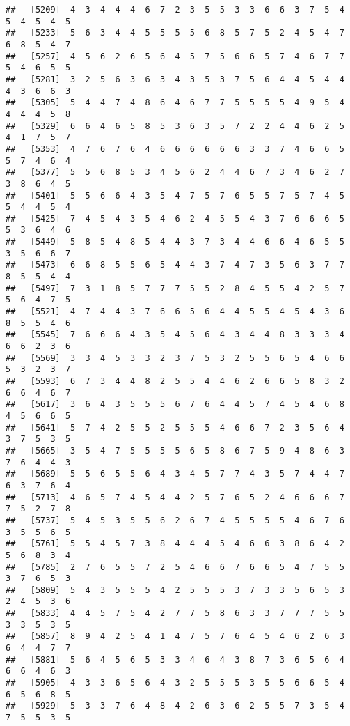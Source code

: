 \documentclass[
]{book}
\begin{document}
\begin{verbatim}
##   [5209]  4  3  4  4  4  6  7  2  3  5  5  3  3  6  6  3  7  5  4  5  4  5  4  5
##   [5233]  5  6  3  4  4  5  5  5  5  6  8  5  7  5  2  4  5  4  7  6  8  5  4  7
##   [5257]  4  5  6  2  6  5  6  4  5  7  5  6  6  5  7  4  6  7  7  5  4  6  5  5
##   [5281]  3  2  5  6  3  6  3  4  3  5  3  7  5  6  4  4  5  4  4  4  3  6  6  3
##   [5305]  5  4  4  7  4  8  6  4  6  7  7  5  5  5  5  4  9  5  4  4  4  4  5  8
##   [5329]  6  6  4  6  5  8  5  3  6  3  5  7  2  2  4  4  6  2  5  4  1  7  5  7
##   [5353]  4  7  6  7  6  4  6  6  6  6  6  6  3  3  7  4  6  6  5  5  7  4  6  4
##   [5377]  5  5  6  8  5  3  4  5  6  2  4  4  6  7  3  4  6  2  7  3  8  6  4  5
##   [5401]  5  5  6  6  4  3  5  4  7  5  7  6  5  5  7  5  7  4  5  5  4  4  5  4
##   [5425]  7  4  5  4  3  5  4  6  2  4  5  5  4  3  7  6  6  6  5  5  3  6  4  6
##   [5449]  5  8  5  4  8  5  4  4  3  7  3  4  4  6  6  4  6  5  5  3  5  6  6  7
##   [5473]  6  6  8  5  5  6  5  4  4  3  7  4  7  3  5  6  3  7  7  8  5  5  4  4
##   [5497]  7  3  1  8  5  7  7  7  5  5  2  8  4  5  5  4  2  5  7  5  6  4  7  5
##   [5521]  4  7  4  4  3  7  6  6  5  6  4  4  5  5  4  5  4  3  6  8  5  5  4  6
##   [5545]  7  6  6  6  4  3  5  4  5  6  4  3  4  4  8  3  3  3  4  6  6  2  3  6
##   [5569]  3  3  4  5  3  3  2  3  7  5  3  2  5  5  6  5  4  6  6  5  3  2  3  7
##   [5593]  6  7  3  4  4  8  2  5  5  4  4  6  2  6  6  5  8  3  2  6  6  4  6  7
##   [5617]  3  6  4  3  5  5  5  6  7  6  4  4  5  7  4  5  4  6  8  4  5  6  6  5
##   [5641]  5  7  4  2  5  5  2  5  5  5  4  6  6  7  2  3  5  6  4  3  7  5  3  5
##   [5665]  3  5  4  7  5  5  5  5  6  5  8  6  7  5  9  4  8  6  3  7  6  4  4  3
##   [5689]  5  5  6  5  5  6  4  3  4  5  7  7  4  3  5  7  4  4  7  6  3  7  6  4
##   [5713]  4  6  5  7  4  5  4  4  2  5  7  6  5  2  4  6  6  6  7  7  5  2  7  8
##   [5737]  5  4  5  3  5  5  6  2  6  7  4  5  5  5  5  4  6  7  6  3  5  5  6  5
##   [5761]  5  5  4  5  7  3  8  4  4  4  5  4  6  6  3  8  6  4  2  5  6  8  3  4
##   [5785]  2  7  6  5  5  7  2  5  4  6  6  7  6  6  5  4  7  5  5  3  7  6  5  3
##   [5809]  5  4  3  5  5  5  4  2  5  5  5  3  7  3  3  5  6  5  3  2  4  5  3  6
##   [5833]  4  4  5  7  5  4  2  7  7  5  8  6  3  3  7  7  7  5  5  3  3  5  3  5
##   [5857]  8  9  4  2  5  4  1  4  7  5  7  6  4  5  4  6  2  6  3  6  4  4  7  7
##   [5881]  5  6  4  5  6  5  3  3  4  6  4  3  8  7  3  6  5  6  4  6  6  4  6  3
##   [5905]  4  3  3  6  5  6  4  3  2  5  5  5  3  5  5  6  6  5  4  6  5  6  8  5
##   [5929]  5  3  3  7  6  4  8  4  2  6  3  6  2  5  5  7  3  5  4  7  5  5  3  5

\end{verbatim}
\end{document}
